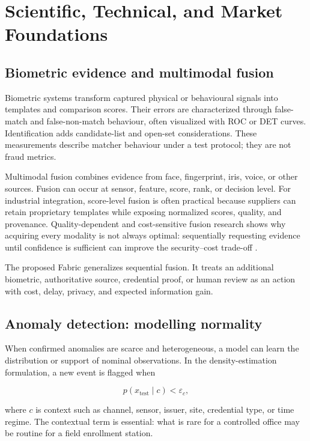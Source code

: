 \chapter[Scientific, Technical, and Market Foundations]{Scientific, Technical, and Market\\Foundations}

\section{Biometric evidence and multimodal fusion}

Biometric systems transform captured physical or behavioural signals into templates and comparison scores. Their errors are characterized through false-match and false-non-match behaviour, often visualized with ROC or DET curves. Identification adds candidate-list and open-set considerations. These measurements describe matcher behaviour under a test protocol; they are not fraud metrics.

Multimodal fusion combines evidence from face, fingerprint, iris, voice, or other sources. Fusion can occur at sensor, feature, score, rank, or decision level. For industrial integration, score-level fusion is often practical because suppliers can retain proprietary templates while exposing normalized scores, quality, and provenance. Quality-dependent and cost-sensitive fusion research shows why acquiring every modality is not always optimal: sequentially requesting evidence until confidence is sufficient can improve the security--cost trade-off \citep{poh2009quality}.

The proposed Fabric generalizes sequential fusion. It treats an additional biometric, authoritative source, credential proof, or human review as an action with cost, delay, privacy, and expected information gain.

\section{Anomaly detection: modelling normality}

When confirmed anomalies are scarce and heterogeneous, a model can learn the distribution or support of nominal observations. In the density-estimation formulation, a new event is flagged when

\begin{equation}
p(x_{\mathrm{test}}\mid c)<\varepsilon_c,
\end{equation}

where $c$ is context such as channel, sensor, issuer, site, credential type, or time regime. The contextual term is essential: what is rare for a controlled office may be routine for a field enrollment station.

